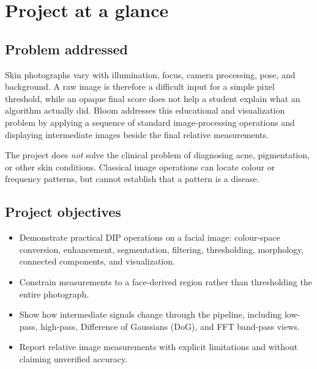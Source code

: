 \documentclass[11pt,a4paper]{article}
\title{\textbf{Bloom: Facial Skin Image Analysis}\[3pt]
\large A Digital Image Processing Project Overview}
\author{DIP Course Project \\ Rajiv Gandhi Institute of Petroleum Technology}
\date{\today}
\begin{document}
\maketitle

\begin{abstract}
Bloom is an educational web application that demonstrates a classical digital image processing (DIP) pipeline on facial photographs. It validates an image, locates a face and candidate skin area, enhances luminance, computes spatial- and frequency-domain responses, and visualizes relative colour and texture patterns. The application is designed to make intermediate processing stages inspectable. Its outputs are image-based estimates: they are not diagnoses, clinically validated severity scores, or measured detection accuracy.
\end{abstract}

\tableofcontents
\newpage

\section{Project at a glance}

\subsection{Problem addressed}
Skin photographs vary with illumination, focus, camera processing, pose, and background. A raw image is therefore a difficult input for a simple pixel threshold, while an opaque final score does not help a student explain what an algorithm actually did. Bloom addresses this educational and visualization problem by applying a sequence of standard image-processing operations and displaying intermediate images beside the final relative measurements.

The project does \emph{not} solve the clinical problem of diagnosing acne, pigmentation, or other skin conditions. Classical image operations can locate colour or frequency patterns, but cannot establish that a pattern is a disease.

\subsection{Project objectives}
\begin{itemize}
  \item Demonstrate practical DIP operations on a facial image: colour-space conversion, enhancement, segmentation, filtering, thresholding, morphology, connected components, and visualization.
  \item Constrain measurements to a face-derived region rather than thresholding the entire photograph.
  \item Show how intermediate signals change through the pipeline, including low-pass, high-pass, Difference of Gaussians (DoG), and FFT band-pass views.
  \item Report relative image measurements with explicit limitations and without claiming unverified accuracy.
\end{itemize}
\end{document}
